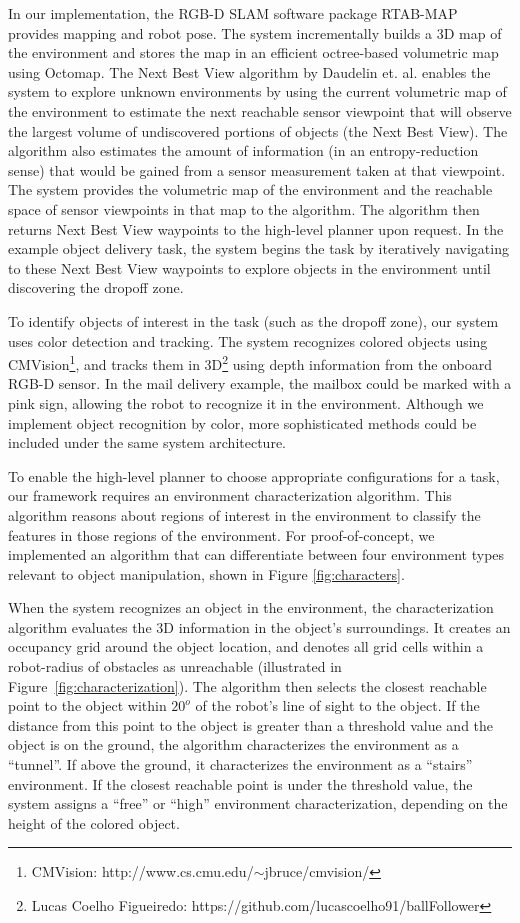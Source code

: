 \documentclass[journal]{IEEEtran}
\begin{document}
In our implementation, the RGB-D SLAM software package RTAB-MAP\cite{rtabmap} provides mapping and robot pose. The system incrementally builds a 3D map of the environment and stores the map in an efficient octree-based volumetric map using Octomap\cite{octomap}. The Next Best View algorithm by Daudelin et. al.\cite{Daudelin2017} enables the system to explore unknown environments by using the current volumetric map of the environment to estimate the next reachable sensor viewpoint that will observe the largest volume of undiscovered portions of objects (the Next Best View). The algorithm also estimates the amount of information (in an entropy-reduction sense) that would be gained from a sensor measurement taken at that viewpoint. The system provides the volumetric map of the environment and the reachable space of sensor viewpoints in that map to the algorithm. The algorithm then returns Next Best View waypoints to the high-level planner upon request. In the example object delivery task, the system begins the task by iteratively navigating to these Next Best View waypoints to explore objects in the environment until discovering the dropoff zone.

To identify objects of interest in the task (such as the dropoff zone), our system uses color detection and tracking.  The system recognizes colored objects using CMVision\footnote{CMVision: http://www.cs.cmu.edu/$\sim$jbruce/cmvision/}, and tracks them in 3D\footnote{Lucas Coelho Figueiredo: https://github.com/lucascoelho91/ballFollower} using depth information from the onboard RGB-D sensor. In the mail delivery example, the mailbox could be marked with a pink sign, allowing the robot to recognize it in the environment. Although we implement object recognition by color, more sophisticated methods could be included under the same system architecture.

To enable the high-level planner to choose appropriate configurations for a task, our framework requires an environment characterization algorithm. This algorithm reasons about regions of interest in the environment to classify the features in those regions of the environment. For proof-of-concept, we implemented an algorithm that can differentiate between four environment types relevant to object manipulation, shown in Figure \ref{fig:characters}. 

When the system recognizes an object in the environment, the characterization algorithm evaluates the 3D information in the object's surroundings. It creates an occupancy grid around the object location, and denotes all grid cells within a robot-radius of obstacles as unreachable (illustrated in Figure~\ref{fig:characterization}). The algorithm then selects the closest reachable point to the object within $20^o$ of the robot's line of sight to the object. If the distance from this point to the object is greater than a threshold value and the object is on the ground, the algorithm characterizes the environment as a ``tunnel''. If above the ground, it characterizes the environment as a ``stairs'' environment. If the closest reachable point is under the threshold value, the system assigns a ``free'' or ``high'' environment characterization, depending on the height of the colored object.
\end{document}
